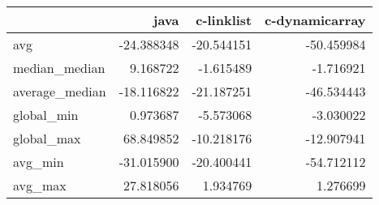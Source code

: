 \begin{tabular}{lrrr}
\toprule
{} &       java &  c-linklist &  c-dynamicarray \\
\midrule
avg            & -24.388348 &  -20.544151 &      -50.459984 \\
median\_median  &   9.168722 &   -1.615489 &       -1.716921 \\
average\_median & -18.116822 &  -21.187251 &      -46.534443 \\
global\_min     &   0.973687 &   -5.573068 &       -3.030022 \\
global\_max     &  68.849852 &  -10.218176 &      -12.907941 \\
avg\_min        & -31.015900 &  -20.400441 &      -54.712112 \\
avg\_max        &  27.818056 &    1.934769 &        1.276699 \\
\bottomrule
\end{tabular}
